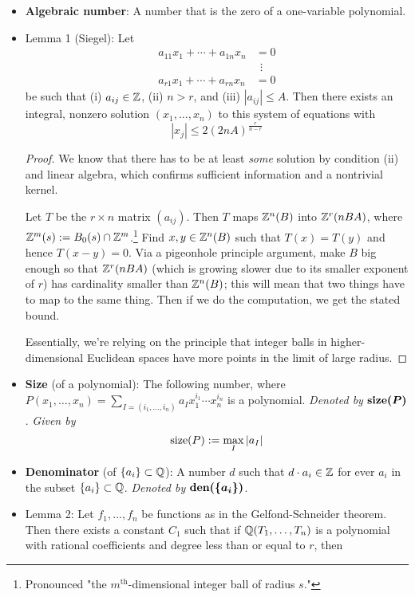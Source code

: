 \documentclass[../notes.tex]{subfiles}
\begin{document}
\begin{itemize}
    \item \textbf{Algebraic number}: A number that is the zero of a one-variable polynomial.
    \item Lemma 1 (Siegel): Let
    \begin{align*}
        a_{11}x_1+\cdots+a_{1n}x_n &= 0\\
        &\ \ \vdots\\
        a_{r1}x_1+\cdots+a_{rn}x_n &= 0
    \end{align*}
    be such that (i) $a_{ij}\in\mathbb{Z}$, (ii) $n>r$, and (iii) $|a_{ij}|\leq A$. Then there exists an integral, nonzero solution $(x_1,\dots,x_n)$ to this system of equations with
    \begin{equation*}
        |x_j| \leq 2(2nA)^{\frac{r}{n-r}}
    \end{equation*}
    \begin{proof}
        We know that there has to be at least \emph{some} solution by condition (ii) and linear algebra, which confirms sufficient information and a nontrivial kernel.\par
        Let $T$ be the $r\times n$ matrix $(a_{ij})$. Then $T$ maps $\mathbb{Z}^n(B)$ into $\mathbb{Z}^r(nBA)$, where $\mathbb{Z}^m(s):=B_0(s)\cap\mathbb{Z}^m$.\footnote{Pronounced "the $m^\text{th}$-dimensional integer ball of radius $s$."} Find $x,y\in\mathbb{Z}^n(B)$ such that $T(x)=T(y)$ and hence $T(x-y)=0$. Via a pigeonhole principle argument, make $B$ big enough so that $\mathbb{Z}^r(nBA)$ (which is growing slower due to its smaller exponent of $r$) has cardinality smaller than $\mathbb{Z}^n(B)$; this will mean that two things have to map to the same thing. Then if we do the computation, we get the stated bound.\par
        Essentially, we're relying on the principle that integer balls in higher-dimensional Euclidean spaces have more points in the limit of large radius.
    \end{proof}
    \item \textbf{Size} (of a polynomial): The following number, where $P(x_1,\dots,x_n)=\sum_{I=(i_1,\dots,i_n)}a_Ix_1^{i_1}\cdots x_n^{i_n}$ is a polynomial. \emph{Denoted by} $\bm{\size(P)}$. \emph{Given by}
    \begin{equation*}
        \operatorname{size}(P) := \max_I|a_I|
    \end{equation*}
    \item \textbf{Denominator} (of $\{a_i\}\subset\mathbb{Q}$): A number $d$ such that $d\cdot a_i\in\mathbb{Z}$ for ever $a_i$ in the subset $\{a_i\}\subset\mathbb{Q}$. \emph{Denoted by} $\bm{\den(\{a_i\})}$.
    \item Lemma 2: Let $f_1,\dots,f_n$ be functions as in the Gelfond-Schneider theorem. Then there exists a constant $C_1$ such that if $\mathbb{Q}(T_1,\dots,T_n)$ is a polynomial with rational coefficients and degree less than or equal to $r$, then

\end{itemize}
\end{document}
